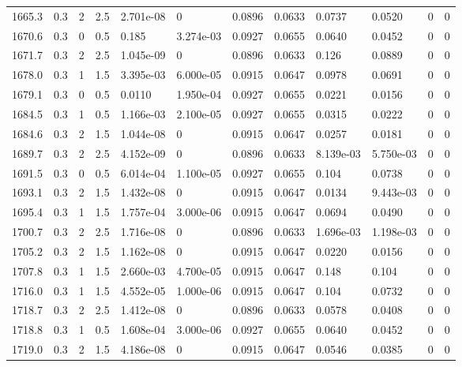\documentclass[preview]{standalone}
\begin{document}
{{{{{{{{{{\begin{tabular}{L{1.2cm}C{1.2cm} C{0.3cm}C{0.5cm} C{1.4cm}C{1.4cm} C{1.4cm}C{1.4cm} C{1.6cm}C{1.6cm} C{1.6cm}C{1.6cm}}
  1665.3  &   0.3  & 2     & 2.5 &  2.701e-08  & 0  &  0.0896&   0.0633& 0.0737 & 0.0520   &  0 & 0  \\ 
  1670.6  &   0.3  & 0     & 0.5 &  0.185  & 3.274e-03  &  0.0927&   0.0655& 0.0640 & 0.0452   &  0 & 0  \\ 
  1671.7  &   0.3  & 2     & 2.5 &  1.045e-09  & 0  &  0.0896&   0.0633& 0.126 & 0.0889   &  0 & 0  \\ 
  1678.0  &   0.3  & 1     & 1.5 &  3.395e-03  & 6.000e-05  &  0.0915&   0.0647& 0.0978 & 0.0691   &  0 & 0  \\ 
  1679.1  &   0.3  & 0     & 0.5 &  0.0110  & 1.950e-04  &  0.0927&   0.0655& 0.0221 & 0.0156   &  0 & 0  \\ 
  1684.5  &   0.3  & 1     & 0.5 &  1.166e-03  & 2.100e-05  &  0.0927&   0.0655& 0.0315 & 0.0222   &  0 & 0  \\ 
  1684.6  &   0.3  & 2     & 1.5 &  1.044e-08  & 0  &  0.0915&   0.0647& 0.0257 & 0.0181   &  0 & 0  \\ 
  1689.7  &   0.3  & 2     & 2.5 &  4.152e-09  & 0  &  0.0896&   0.0633& 8.139e-03 & 5.750e-03   &  0 & 0  \\ 
  1691.5  &   0.3  & 0     & 0.5 &  6.014e-04  & 1.100e-05  &  0.0927&   0.0655& 0.104 & 0.0738   &  0 & 0  \\ 
  1693.1  &   0.3  & 2     & 1.5 &  1.432e-08  & 0  &  0.0915&   0.0647& 0.0134 & 9.443e-03   &  0 & 0  \\ 
  1695.4  &   0.3  & 1     & 1.5 &  1.757e-04  & 3.000e-06  &  0.0915&   0.0647& 0.0694 & 0.0490   &  0 & 0  \\ 
  1700.7  &   0.3  & 2     & 2.5 &  1.716e-08  & 0  &  0.0896&   0.0633& 1.696e-03 & 1.198e-03   &  0 & 0  \\ 
  1705.2  &   0.3  & 2     & 1.5 &  1.162e-08  & 0  &  0.0915&   0.0647& 0.0220 & 0.0156   &  0 & 0  \\ 
  1707.8  &   0.3  & 1     & 1.5 &  2.660e-03  & 4.700e-05  &  0.0915&   0.0647& 0.148 & 0.104   &  0 & 0  \\ 
  1716.0  &   0.3  & 1     & 1.5 &  4.552e-05  & 1.000e-06  &  0.0915&   0.0647& 0.104 & 0.0732   &  0 & 0  \\ 
  1718.7  &   0.3  & 2     & 2.5 &  1.412e-08  & 0  &  0.0896&   0.0633& 0.0578 & 0.0408   &  0 & 0  \\ 
  1718.8  &   0.3  & 1     & 0.5 &  1.608e-04  & 3.000e-06  &  0.0927&   0.0655& 0.0640 & 0.0452   &  0 & 0  \\ 
  1719.0  &   0.3  & 2     & 1.5 &  4.186e-08  & 0  &  0.0915&   0.0647& 0.0546 & 0.0385   &  0 & 0  \\ 

\end{tabular}}}}}}}}}}}
\end{document}
